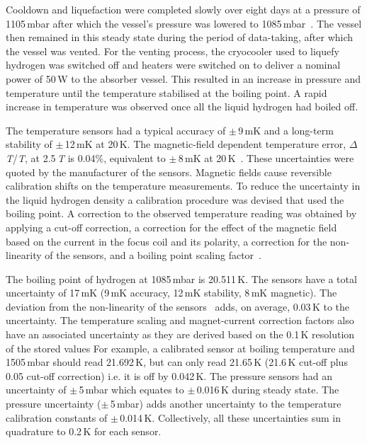 Cooldown and liquefaction were completed slowly over eight days at a
pressure of 1105\,mbar after which the vessel's pressure was lowered to
1085\,mbar~\cite{1748-0221-13-09-T09008}.
The vessel then remained in this steady state during the period of data-taking, after which the vessel was vented. For the venting process,
the cryocooler used to liquefy hydrogen was
switched off and heaters were switched on to deliver a nominal power
of 50\,W to the absorber vessel.
This resulted in an increase in pressure and temperature until the
temperature stabilised at the boiling point.
A rapid increase in temperature was observed once all the
liquid hydrogen had boiled off. 

The temperature sensors had a typical accuracy of
$\mathrm{\pm}$\,9\,mK and a long-term stability of
$\mathrm{\pm}$\,12\,mK at 20\,K.
The magnetic-field dependent temperature error, $\Delta$\textit{T}/\textit{T}, at 2.5\,\textit{T} is 0.04\%,
equivalent to $\mathrm{\pm}$\,8\,mK at
20\,K~\cite{TemperatureMeasurement}.
These uncertainties were quoted by the manufacturer of the sensors.
Magnetic fields cause reversible calibration shifts on the temperature
measurements.
To reduce the uncertainty in the liquid hydrogen density a calibration
procedure was devised that used the boiling point.
A correction to the observed temperature reading was obtained by
applying a cut-off correction, a correction for the effect of the
magnetic field based on the current in the focus coil and its
polarity, a correction for the non-linearity of the sensors, and a 
boiling point scaling factor~\cite{NOTE524}.  
 
The boiling point of hydrogen at 1085\,mbar is 20.511\,K.
The sensors have a total uncertainty of 17\,mK (9\,mK accuracy, 12\,mK
stability, 8\,mK magnetic).
The deviation from the non-linearity of the sensors~\cite{TemperatureMeasurement} adds, on average,
0.03\,K to the uncertainty.
The temperature scaling and magnet-current correction factors also
have an associated uncertainty as they are derived based on the 0.1\,K resolution of the stored values
For example, a calibrated sensor at boiling temperature and 1505\,mbar
should read 21.692\,K, but can only read 21.65\,K (21.6\,K cut-off
plus 0.05 cut-off correction) i.e. it is off by 0.042\,K.
The pressure sensors had an uncertainty of $\mathrm{\pm}$\,5\,mbar
which equates to $\mathrm{\pm}$\,0.016\,K during steady state.
The pressure uncertainty ($\mathrm{\pm}$\,5\,mbar) adds another
uncertainty to the temperature calibration constants of
$\mathrm{\pm}$\,0.014\,K.
Collectively, all these uncertainties sum in quadrature to 0.2\,K for
each sensor.
 
